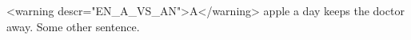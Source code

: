 
    <warning descr="EN_A_VS_AN">A</warning> apple a day keeps the doctor away.
    Some other sentence.
